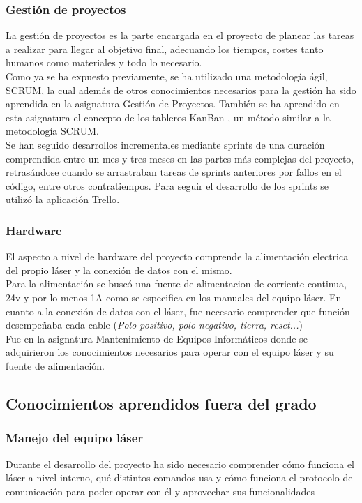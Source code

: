 	\subsubsection{Gestión de proyectos}
		La gestión de proyectos es la parte encargada en el proyecto de planear las tareas a realizar para llegar al objetivo final, adecuando los tiempos, costes tanto humanos como 				materiales y todo lo necesario. \\ Como ya se ha expuesto previamente, se ha utilizado una metodología ágil, SCRUM, la cual además de otros conocimientos necesarios para la 				gestión ha sido aprendida en la asignatura Gestión de Proyectos. También se ha aprendido en esta asignatura el concepto de los tableros KanBan \cite{wiki:Tableros_Kanban}
		, un método similar a la metodología SCRUM.\\
Se han seguido desarrollos incrementales mediante sprints de una duración comprendida entre un mes y tres meses en las partes más complejas del proyecto, retrasándose cuando se arrastraban tareas de sprints anteriores por fallos en el código, entre otros contratiempos. Para seguir el desarrollo de los sprints se utilizó la aplicación \href{https://trello.com/}{Trello}.\\
	\subsubsection{Hardware}
		El aspecto a nivel de hardware del proyecto comprende  la alimentación electrica del propio láser y la conexión de datos con el mismo.\\
		Para la alimentación se buscó una fuente de alimentacion de corriente continua, 24v y por lo menos 1A como se especifica en los manuales del equipo láser.
		En cuanto a la conexión de datos con el láser, fue necesario comprender que función desempeñaba cada cable (\textit{Polo positivo, polo negativo, tierra, reset...})\\
		Fue en la asignatura Mantenimiento de Equipos Informáticos donde se adquirieron los conocimientos necesarios para operar con el equipo láser y su fuente de alimentación.\\

	
	\subsection{Conocimientos aprendidos fuera del grado}


		\subsubsection{Manejo del equipo láser}
			Durante el desarrollo del proyecto ha sido necesario comprender cómo funciona el láser a nivel interno, qué distintos comandos usa y cómo funciona el protocolo de 						comunicación para poder operar con él y aprovechar sus funcionalidades\\

